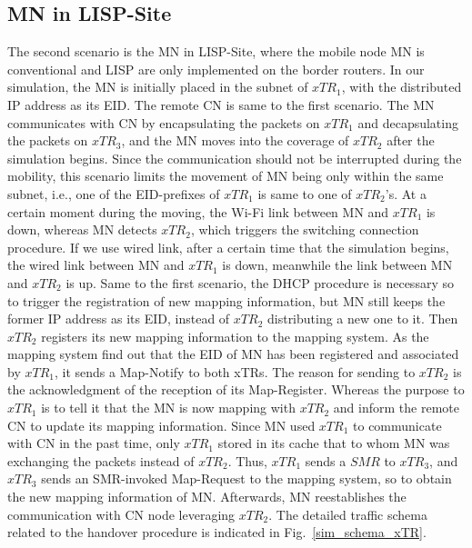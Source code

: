 \subsection{MN in LISP-Site}
\label{sec:ns3_analysis_xTR}
The second scenario is the MN in LISP-Site, where the mobile node MN is conventional and LISP are only implemented on the border routers. In our simulation, the MN is initially placed in the subnet of $xTR_1$, with the distributed IP address as its EID. The remote CN is same to the first scenario. The MN communicates with CN by encapsulating the packets on $xTR_1$ and decapsulating the packets on $xTR_3$, and the MN moves into the coverage of $xTR_2$ after the simulation begins. Since the communication should not be interrupted during the mobility, this scenario limits the movement of MN being only within the same subnet, i.e., one of the EID-prefixes of $xTR_1$ is same to one of $xTR_2$'s. At a certain moment during the moving, the Wi-Fi link between MN and $xTR_1$ is down, whereas MN detects $xTR_2$, which triggers the switching connection procedure. If we use wired link, after a certain time that the simulation begins, the wired link between MN and $xTR_1$ is down, meanwhile the link between MN and $xTR_2$ is up. Same to the first scenario, the DHCP procedure is necessary so to trigger the registration of new mapping information, but MN still keeps the former IP address as its EID, instead of $xTR_2$ distributing a new one to it. Then $xTR_2$ registers its new mapping information to the mapping system. As the mapping system find out that the EID of MN has been registered and associated by $xTR_1$, it sends a Map-Notify to both xTRs. The reason for sending to $xTR_2$ is the acknowledgment of the reception of its Map-Register. Whereas the purpose to $xTR_1$ is to tell it that the MN is now mapping with $xTR_2$ and inform the remote CN to update its mapping information. Since MN used $xTR_1$ to communicate with CN in the past time, only $xTR_1$ stored in its cache that to whom MN was exchanging the packets instead of $xTR_2$. Thus, $xTR_1$ sends a $SMR$ to $xTR_3$, and $xTR_3$ sends an SMR-invoked Map-Request to the mapping system, so to obtain the new mapping information of MN. Afterwards, MN reestablishes the communication with CN node leveraging $xTR_2$. The detailed traffic schema related to the handover procedure is indicated in Fig.~\ref{sim_schema_xTR}.
